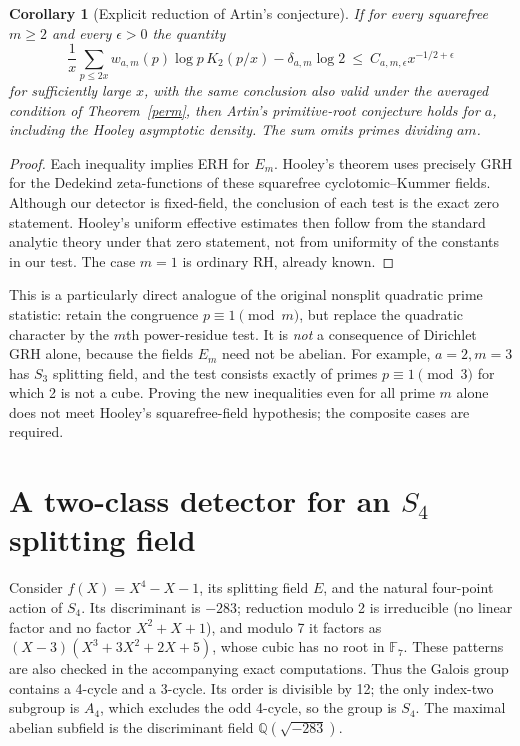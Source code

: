 \documentclass[11pt]{article}
\newtheorem{corollary}[theorem]{Corollary}
\theoremstyle{definition}\newtheorem{definition}[theorem]{Definition}
\newcommand{\Q}{\mathbb Q}\newcommand{\C}{\mathbb C}\newcommand{\R}{\mathbb R}\newcommand{\Rea}{\operatorname{Re}}\newcommand{\Frob}{\operatorname{Frob}}\newcommand{\Gal}{\operatorname{Gal}}\newcommand{\pos}[1]{\left(#1\right)_+}
\begin{document}
\begin{corollary}[Explicit reduction of Artin's conjecture]\label{artin}
If for every squarefree $m\ge2$ and every $\epsilon>0$ the quantity
\[
 \frac1x\sum_{p\le2x}w_{a,m}(p)\log p\,K_2(p/x)-\delta_{a,m}\log 2
 \ \le\ C_{a,m,\epsilon}x^{-1/2+\epsilon}
\]
for sufficiently large $x$, with the same conclusion also valid under the averaged condition of Theorem~\ref{perm}, then Artin's primitive-root conjecture holds for $a$, including the Hooley asymptotic density. The sum omits primes dividing $am$.
\end{corollary}
\begin{proof}
Each inequality implies ERH for $E_m$. Hooley's theorem \cite{hooley,moree} uses precisely GRH for the Dedekind zeta-functions of these squarefree cyclotomic--Kummer fields. Although our detector is fixed-field, the conclusion of each test is the exact zero statement. Hooley's uniform effective estimates then follow from the standard analytic theory under that zero statement, not from uniformity of the constants in our test. The case $m=1$ is ordinary RH, already known.
\end{proof}
This is a particularly direct analogue of the original nonsplit quadratic prime statistic: retain the congruence $p\equiv1\pmod m$, but replace the quadratic character by the $m$th power-residue test. It is \emph{not} a consequence of Dirichlet GRH alone, because the fields $E_m$ need not be abelian. For example, $a=2,m=3$ has $S_3$ splitting field, and the test consists exactly of primes $p\equiv1\pmod3$ for which 2 is not a cube. Proving the new inequalities even for all prime $m$ alone does not meet Hooley's squarefree-field hypothesis; the composite cases are required.

\section{A two-class detector for an \texorpdfstring{$S_4$}{S4} splitting field}\label{s4}
Consider $f(X)=X^4-X-1$, its splitting field $E$, and the natural four-point action of $S_4$. Its discriminant is $-283$; reduction modulo 2 is irreducible (no linear factor and no factor $X^2+X+1$), and modulo 7 it factors as $(X-3)(X^3+3X^2+2X+5)$, whose cubic has no root in $\mathbb F_7$. These patterns are also checked in the accompanying exact computations. Thus the Galois group contains a 4-cycle and a 3-cycle. Its order is divisible by 12; the only index-two subgroup is $A_4$, which excludes the odd 4-cycle, so the group is $S_4$. The maximal abelian subfield is the discriminant field $\Q(\sqrt{-283})$.
\end{document}
